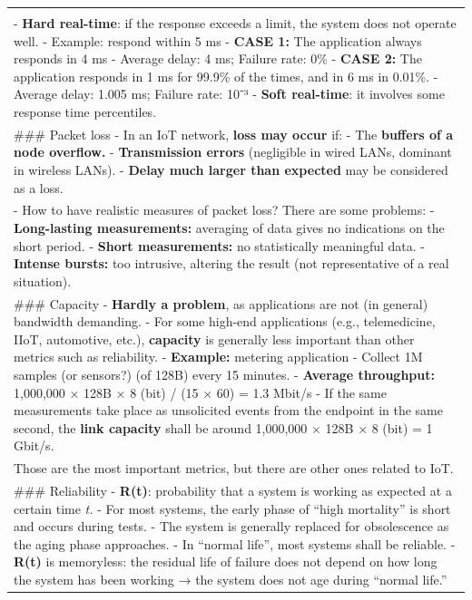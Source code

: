 \documentclass[a4paper, 12pt]{book} %
\begin{document}
\begin{longtable}[]{@{}
  >{\raggedright\arraybackslash}p{}@{}}
{within predictable response times.} \\
- \textbf{Hard real-time}: if the response exceeds a limit, the system
does not operate well. - Example: respond within 5 ms - \textbf{CASE 1:}
The application always responds in 4 ms - Average delay: 4 ms; Failure
rate: 0\% - \textbf{CASE 2:} The application responds in 1 ms for 99.9\%
of the times, and in 6 ms in 0.01\%. - Average delay: 1.005 ms; Failure
rate: 10⁻³ - \textbf{Soft real-time}: it involves some response time
percentiles. \\
\#\#\# Packet loss - In an IoT network, \textbf{loss may occur} if: -
The \textbf{buffers of a node overflow.} - \textbf{Transmission errors}
(negligible in wired LANs, dominant in wireless LANs). - \textbf{Delay
much larger than expected} may be considered as a loss. \\
- How to have realistic measures of packet loss? There are some
problems: - \textbf{Long-lasting measurements:} averaging of data gives
no indications on the short period. - \textbf{Short measurements:} no
statistically meaningful data. - \textbf{Intense bursts:} too intrusive,
altering the result (not representative of a real situation). \\
\#\#\# Capacity - \textbf{Hardly a problem}, as applications are not (in
general) bandwidth demanding. - For some high-end applications (e.g.,
telemedicine, IIoT, automotive, etc.), \textbf{capacity} is generally
less important than other metrics such as reliability. -
\textbf{Example:} metering application - Collect 1M samples (or
sensors?) (of 128B) every 15 minutes. - \textbf{Average throughput:}
1,000,000 × 128B × 8 (bit) / (15 × 60) = 1.3 Mbit/s - If the same
measurements take place as unsolicited events from the endpoint in the
same second, the \textbf{link capacity} shall be around 1,000,000 × 128B
× 8 (bit) = 1 Gbit/s. \\
Those are the most important metrics, but there are other ones related
to IoT. \\
\#\#\# Reliability - \textbf{R(t)}: probability that a system is working
as expected at a certain time \emph{t.} - For most systems, the early
phase of ``high mortality'' is short and occurs during tests. - The
system is generally replaced for obsolescence as the aging phase
approaches. - In ``normal life'', most systems shall be reliable. -
\textbf{R(t)} is memoryless: the residual life of failure does not
depend on how long the system has been working → the system does not age
during ``normal life.''
\pandocbounded{\begin{figure}[h]

\end{figure}}
\end{longtable}
\end{document}
